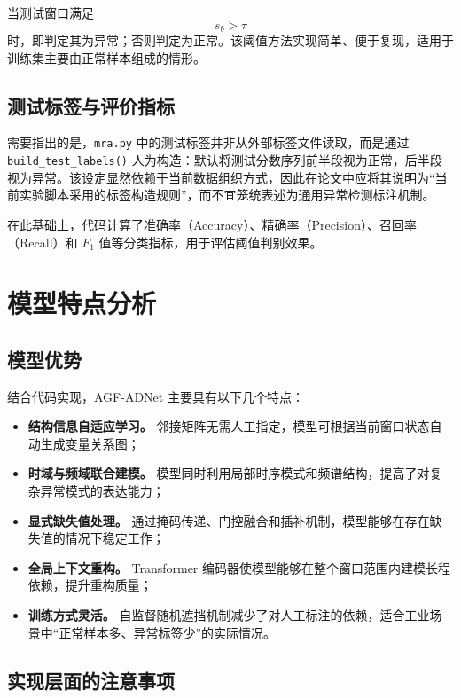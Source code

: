 当测试窗口满足
\begin{equation}
    s_b > \tau
\end{equation}
时，即判定其为异常；否则判定为正常。该阈值方法实现简单、便于复现，适用于训练集主要由正常样本组成的情形。

\subsection{测试标签与评价指标}

需要指出的是，\texttt{mra.py} 中的测试标签并非从外部标签文件读取，而是通过 \texttt{build\_test\_labels()} 人为构造：默认将测试分数序列前半段视为正常，后半段视为异常。该设定显然依赖于当前数据组织方式，因此在论文中应将其说明为“当前实验脚本采用的标签构造规则”，而不宜笼统表述为通用异常检测标注机制。

在此基础上，代码计算了准确率（Accuracy）、精确率（Precision）、召回率（Recall）和 $F_1$ 值等分类指标，用于评估阈值判别效果。

\section{模型特点分析}

\subsection{模型优势}

结合代码实现，AGF-ADNet 主要具有以下几个特点：
\begin{itemize}
    \item \textbf{结构信息自适应学习。} 邻接矩阵无需人工指定，模型可根据当前窗口状态自动生成变量关系图；
    \item \textbf{时域与频域联合建模。} 模型同时利用局部时序模式和频谱结构，提高了对复杂异常模式的表达能力；
    \item \textbf{显式缺失值处理。} 通过掩码传递、门控融合和插补机制，模型能够在存在缺失值的情况下稳定工作；
    \item \textbf{全局上下文重构。} Transformer 编码器使模型能够在整个窗口范围内建模长程依赖，提升重构质量；
    \item \textbf{训练方式灵活。} 自监督随机遮挡机制减少了对人工标注的依赖，适合工业场景中“正常样本多、异常标签少”的实际情况。
\end{itemize}

\subsection{实现层面的注意事项}

